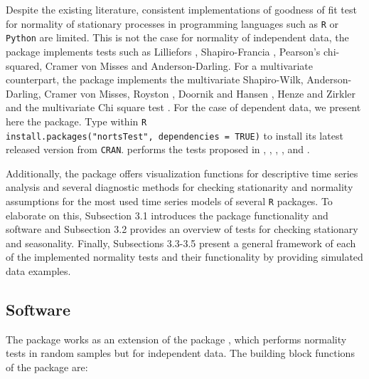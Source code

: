 Despite the existing literature, consistent implementations of goodness of fit test for normality of stationary processes in programming languages such as \texttt{R} or \texttt{Python} are limited. This is not the case for normality of independent data, the  package \citep{nortest2015} implements tests such as Lilliefors \citep{Wilkinson1986}, Shapiro-Francia \citep{Royston1993}, Pearson's chi-squared, Cramer von Misses \citep{vonMisses1962} and Anderson-Darling. For a multivariate counterpart, the  package \citep{mvntest} implements the multivariate Shapiro-Wilk, Anderson-Darling, Cramer von Misses, Royston \citep{Royston1992}, Doornik and Hansen \citep{DH2008}, Henze and Zirkler \citep{HZ1990} and the multivariate Chi square test \citep{S2_2016}. For the case of dependent data, we present here the  package. Type within \texttt{R} \texttt{install.packages("nortsTest",\ dependencies\ =\ TRUE)} to install its latest released version from \texttt{CRAN}.  performs the tests proposed in \citet{epps1987}, \citet{Lobato2004}, \citet{psaradakis2020normality}, \citet{nietoreyes2014}, \citet{vavra2017} and \citet{el2022normality}.

Additionally, the package offers visualization functions for descriptive time series analysis and several diagnostic methods for checking stationarity and normality assumptions for the most used time series models of several \texttt{R} packages. To elaborate on this, Subsection 3.1 introduces the package functionality and software and Subsection 3.2 provides an overview of tests for checking stationary and seasonality. Finally, Subsections 3.3-3.5 present a general framework of each of the implemented normality tests and their functionality by providing simulated data examples.

\subsection{Software}\label{software}

The package works as an extension of the  package \citep{nortest2015}, which performs normality tests in random samples but for independent data. The building block functions of the  package are:

